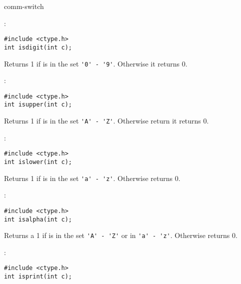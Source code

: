 \begin{Ventry2}{comm-switch  }


\item[isdigit]
:

\begin{production}
\begin{verbatim}
#include <ctype.h>
int isdigit(int c);
\end{verbatim}
\end{production}


Returns 1 if  is in the set \verb+'0' - '9'+. 
Otherwise it returns 0.

\item[isupper]
:

\begin{production}
\begin{verbatim}
#include <ctype.h>
int isupper(int c);
\end{verbatim}
\end{production}


Returns 1 if  is in the set \verb+'A' - 'Z'+.  Otherwise
return it returns 0.

\item[islower]
:

\begin{production}
\begin{verbatim}
#include <ctype.h>
int islower(int c);
\end{verbatim}
\end{production}


Returns  1 if  is in the set \verb+'a' - 'z'+.  Otherwise
returns 0.

\item[isalpha]
:

\begin{production}
\begin{verbatim}
#include <ctype.h>
int isalpha(int c);
\end{verbatim}
\end{production}


Returns a 1 if  is in the set \verb+'A' - 'Z'+ or in \verb+'a' - 'z'+. 
Otherwise returns 0.

\item[isprint]
:

\begin{production}
\begin{verbatim}
#include <ctype.h>
int isprint(int c);
\end{verbatim}
\end{production}



\end{Ventry2}
